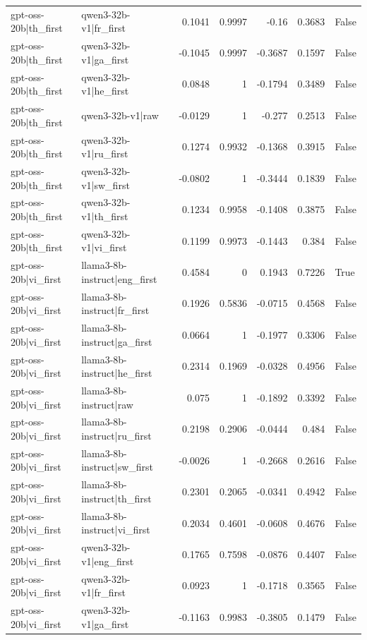 \begin{table}
\begin{tabular}{l l r r r r l}
gpt-oss-20b|th_first & qwen3-32b-v1|fr_first & 0.1041 & 0.9997 & -0.16 & 0.3683 & False \\
gpt-oss-20b|th_first & qwen3-32b-v1|ga_first & -0.1045 & 0.9997 & -0.3687 & 0.1597 & False \\
gpt-oss-20b|th_first & qwen3-32b-v1|he_first & 0.0848 & 1 & -0.1794 & 0.3489 & False \\
gpt-oss-20b|th_first & qwen3-32b-v1|raw & -0.0129 & 1 & -0.277 & 0.2513 & False \\
gpt-oss-20b|th_first & qwen3-32b-v1|ru_first & 0.1274 & 0.9932 & -0.1368 & 0.3915 & False \\
gpt-oss-20b|th_first & qwen3-32b-v1|sw_first & -0.0802 & 1 & -0.3444 & 0.1839 & False \\
gpt-oss-20b|th_first & qwen3-32b-v1|th_first & 0.1234 & 0.9958 & -0.1408 & 0.3875 & False \\
gpt-oss-20b|th_first & qwen3-32b-v1|vi_first & 0.1199 & 0.9973 & -0.1443 & 0.384 & False \\
gpt-oss-20b|vi_first & llama3-8b-instruct|eng_first & 0.4584 & 0 & 0.1943 & 0.7226 & True \\
gpt-oss-20b|vi_first & llama3-8b-instruct|fr_first & 0.1926 & 0.5836 & -0.0715 & 0.4568 & False \\
gpt-oss-20b|vi_first & llama3-8b-instruct|ga_first & 0.0664 & 1 & -0.1977 & 0.3306 & False \\
gpt-oss-20b|vi_first & llama3-8b-instruct|he_first & 0.2314 & 0.1969 & -0.0328 & 0.4956 & False \\
gpt-oss-20b|vi_first & llama3-8b-instruct|raw & 0.075 & 1 & -0.1892 & 0.3392 & False \\
gpt-oss-20b|vi_first & llama3-8b-instruct|ru_first & 0.2198 & 0.2906 & -0.0444 & 0.484 & False \\
gpt-oss-20b|vi_first & llama3-8b-instruct|sw_first & -0.0026 & 1 & -0.2668 & 0.2616 & False \\
gpt-oss-20b|vi_first & llama3-8b-instruct|th_first & 0.2301 & 0.2065 & -0.0341 & 0.4942 & False \\
gpt-oss-20b|vi_first & llama3-8b-instruct|vi_first & 0.2034 & 0.4601 & -0.0608 & 0.4676 & False \\
gpt-oss-20b|vi_first & qwen3-32b-v1|eng_first & 0.1765 & 0.7598 & -0.0876 & 0.4407 & False \\
gpt-oss-20b|vi_first & qwen3-32b-v1|fr_first & 0.0923 & 1 & -0.1718 & 0.3565 & False \\
gpt-oss-20b|vi_first & qwen3-32b-v1|ga_first & -0.1163 & 0.9983 & -0.3805 & 0.1479 & False \\

\end{tabular}
\end{table}
